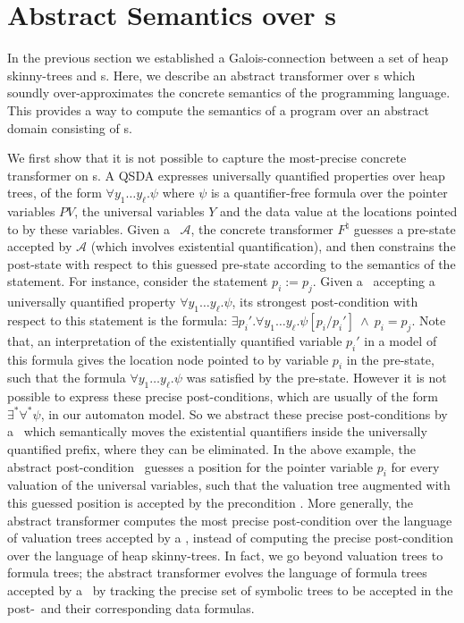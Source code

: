\documentclass{llncs}
\newcommand{\A}{\mathcal{A}}
\newcommand{\PV}{\mathit{PV}}
\begin{document}
\section{Abstract Semantics over \QSDA s}
\label{qdas}




In the previous section we established a Galois-connection between a set of heap skinny-trees and \QSDA s. Here, we describe an abstract transformer over \QSDA s which soundly over-approximates the concrete semantics of the programming language. This provides a way to compute the semantics of a program over an abstract domain consisting of \QSDA s.



We first show that it is not possible to capture the most-precise concrete transformer on \QSDA s.
A QSDA expresses universally quantified properties over heap trees, of the form $\forall y_1 \ldots y_\ell. \psi$ where $\psi$ is a quantifier-free formula over the pointer variables $\PV$, the universal variables $Y$ and the data value at the locations pointed to by these variables.
Given a \QSDA\ $\A$, the concrete transformer $F^\natural$ guesses a pre-state accepted by $\A$ (which involves existential quantification), and then constrains the post-state with respect to this guessed pre-state according to the semantics of the statement.
For instance, consider the statement $p_i := p_j$. Given a \QSDA\ accepting a universally quantified property $\forall y_1 \ldots y_\ell. \psi$, its strongest post-condition with respect to this statement is the formula: $\exists p_i'. \forall y_1 \ldots y_\ell. \psi[p_i/p_i'] ~\wedge~ p_i = p_j$.
\noindent Note that, an interpretation of the existentially quantified variable $p_i'$ in a model of this formula gives the location node pointed to by variable $p_i$ in the pre-state, such that the formula $\forall y_1 \ldots y_\ell. \psi$ was satisfied by the pre-state.
However it is not possible to express these precise post-conditions, which are usually of the form $\exists^* \forall^* \psi$, in our automaton model.
So we abstract these precise post-conditions by a \QSDA\ which semantically moves the existential quantifiers inside the universally quantified prefix, where they can be eliminated.
In the above example, the abstract post-condition \QSDA\ guesses a  position for the pointer variable $p_i$ for every valuation of the universal variables,  such that the valuation tree augmented with this guessed position is accepted by the precondition \QSDA. More generally, the abstract transformer computes the most precise post-condition over the language of valuation trees accepted by a \QSDA, instead of computing the precise post-condition over the language of heap skinny-trees.
In fact, we go beyond valuation trees to formula trees; the abstract transformer evolves the language of formula trees accepted by a \QSDA\ by tracking the precise set of symbolic trees to be accepted in the post-\QSDA\ and their corresponding data formulas.
\end{document}
